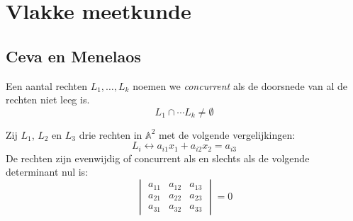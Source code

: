 \documentclass[main.tex]{subfiles}
\begin{document}
\chapter{Vlakke meetkunde}
\label{cha:vlakke-meetkunde}

\section{Ceva en Menelaos}
\label{sec:ceva-en-menelaos}

\begin{de}
  Een aantal rechten $L_{1},\dotsc,L_{k}$ noemen we \emph{concurrent} als de doorsnede van al de rechten niet leeg is.
  \[ L_{1} \cap \dotsb L_{k} \neq \emptyset \]
\end{de}

\begin{lem}
  \label{lem:rechten-concurrent-determinant}
  Zij $L_{1}$, $L_{2}$ en $L_{3}$ drie rechten in $\mathbb{A}^{2}$ met de volgende vergelijkingen:
  \[ L_{i} \leftrightarrow a_{i1}x_{1} + a_{i2}x_{2} = a_{i3} \]
  De rechten zijn evenwijdig of concurrent als en slechts als de volgende determinant nul is:
  \[
  \begin{vmatrix}
    a_{11} & a_{12} & a_{13}\\
    a_{21} & a_{22} & a_{23}\\
    a_{31} & a_{32} & a_{33}
  \end{vmatrix}
  = 0
  \]


\end{lem}
\end{document}
